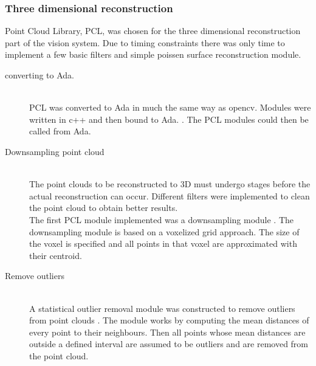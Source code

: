 \subsubsection{Three dimensional reconstruction} 
Point Cloud Library, PCL, was chosen for the three dimensional reconstruction part of the vision system. Due to timing constraints there was only time to implement a few basic filters and simple poissen surface reconstruction module.
\begin{description}
\item[converting to Ada.]\hfill \\
PCL was converted to Ada in much the same way as opencv. Modules were written in c++ and then bound to Ada. \cite{web:newAdaBindings}. The PCL modules could then be called from Ada.

\item[Downsampling point cloud]\hfill \\
The point clouds to be reconstructed to 3D must undergo stages before the actual reconstruction can occur. Different filters were implemented to clean the point cloud to obtain better results.
\\The first PCL module implemented was a downsampling module \cite{web:pclVoxel} . The downsampling module is based on a voxelized grid approach. The size of the voxel is specified and all points in that voxel are approximated with their centroid.	

\item[Remove outliers]\hfill \\
A statistical outlier removal module was constructed to remove outliers from point clouds \cite{web:pclOutliers}. The module works by computing the mean distances of every point to their neighbours. Then all points whose mean distances are outside a defined interval are assumed to be outliers and are removed from the point cloud.
\end{description}